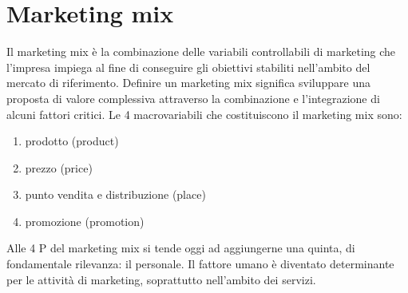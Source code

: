 \chapter{Marketing mix}
Il marketing mix è la combinazione delle variabili controllabili di marketing che l’impresa impiega al fine di conseguire gli obiettivi stabiliti nell’ambito del mercato di riferimento. Definire un marketing mix significa sviluppare una proposta di valore complessiva attraverso la combinazione e l’integrazione di alcuni fattori critici. \newline
Le 4 macrovariabili che costituiscono il marketing mix sono:
\begin{enumerate}
	\item prodotto (product)
	\item prezzo (price)
	\item punto vendita e distribuzione (place)
	\item promozione (promotion)
\end{enumerate}

Alle 4 P del marketing mix si tende oggi ad  aggiungerne una quinta, di fondamentale rilevanza: il personale. Il fattore umano è diventato determinante per le attività di marketing, soprattutto nell'ambito dei servizi. 

